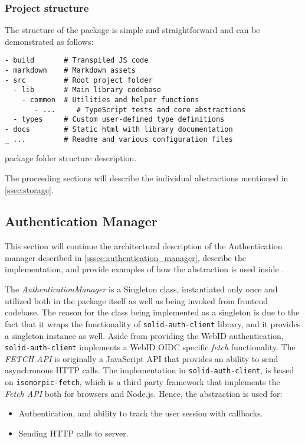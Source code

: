 \subsubsection{Project structure}

The structure of the \lpas{} package is simple and straightforward and can be demonstrated as follows:

\begin{listing}[H]    
\begin{verbatim}
- build       # Transpiled JS code    
- markdown    # Markdown assets
- src         # Root project folder
  - lib       # Main library codebase
    - common  # Utilities and helper functions
       - ...     # TypeScript tests and core abstractions
  - types     # Custom user-defined type definitions
- docs        # Static html with library documentation
_ ...         # Readme and various configuration files
\end{verbatim}
\caption{\lpas{} package folder structure description.} 
\label{lst:lpas_folder_structure}
\end{listing}

The proceeding sections will describe the individual abstractions mentioned in \autoref{ssec:storage}.

\subsection{Authentication Manager}
\label{sssec:authentication_manager_implementation}

This section will continue the architectural description of the Authentication manager described in \autoref{sssec:authentication_manager}, describe the implementation, and provide examples of how the abstraction is used inside \lpa{}.

The \textit{AuthenticationManager} is a Singleton class, instantiated only once and utilized both in the package itself as well as being invoked from \lpa{} frontend codebase. The reason for the class being implemented as a singleton is due to the fact that it wraps the functionality of \texttt{solid-auth-client} library, and it provides a singleton instance as well. Aside from providing the WebID authentication,  \texttt{solid-auth-client} implements a WebID OIDC specific \textit{fetch} functionality. The \textit{FETCH API} is originally a JavaScript API that provides an ability to send asynchronous HTTP calls. The implementation in \texttt{solid-auth-client}, is based on \texttt{isomorpic-fetch}, which is a third party framework that implements the \textit{Fetch API} both for browsers and Node.js. Hence, the abstraction is used for:
\begin{itemize}
    \item Authentication, and ability to track the user session with callbacks. 
    \item Sending HTTP calls to \solid{} server.
\end{itemize}


